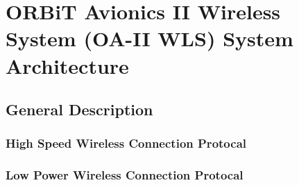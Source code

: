 \documentclass[12pt,article]{memoir}
\begin{document}
\chapter{ORBiT Avionics II Wireless System (OA-II WLS) System Architecture}
\section{General Description}
\subsection{High Speed Wireless Connection Protocal}
\subsection{Low Power Wireless Connection Protocal}

\end{document}
